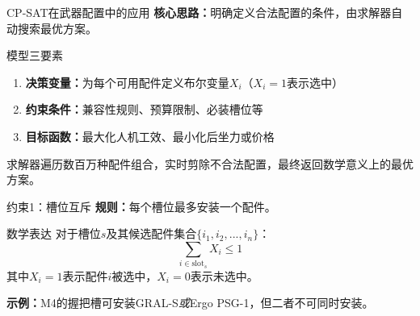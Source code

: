 \documentclass[aspectratio=169]{beamer}
\begin{document}


\begin{frame}{CP-SAT在武器配置中的应用}
    \textbf{核心思路：}明确定义合法配置的条件，由求解器自动搜索最优方案。

    \vspace{0.3cm}
    \begin{block}{模型三要素}
        \begin{enumerate}
            \item \textbf{决策变量：}为每个可用配件定义布尔变量$X_i$（$X_i = 1$表示选中）
            \item \textbf{约束条件：}兼容性规则、预算限制、必装槽位等
            \item \textbf{目标函数：}最大化人机工效、最小化后坐力或价格
        \end{enumerate}
    \end{block}

    \vspace{0.3cm}
    求解器遍历数百万种配件组合，实时剪除不合法配置，最终返回数学意义上的最优方案。
\end{frame}

\begin{frame}{约束1：槽位互斥}
    \textbf{规则：}每个槽位最多安装一个配件。

    \vspace{0.3cm}
    \begin{block}{数学表达}
        对于槽位$s$及其候选配件集合$\{i_1, i_2, ..., i_n\}$：
        \[
        \sum_{i \in \text{slot}_s} X_i \le 1
        \]
        其中$X_i = 1$表示配件$i$被选中，$X_i = 0$表示未选中。
    \end{block}

    \vspace{0.3cm}
    \textbf{示例：}M4的握把槽可安装GRAL-S\textit{或}Ergo PSG-1，但二者不可同时安装。
\end{frame}
\end{document}
